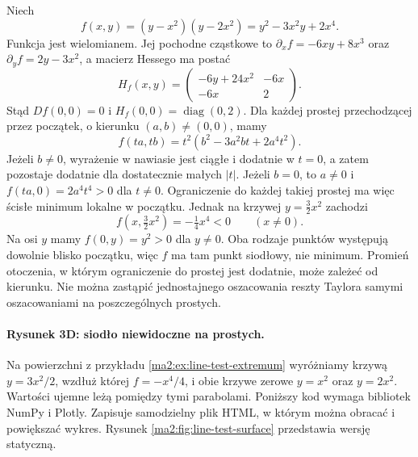 \begin{przyklad}
\label{ma2:ex:line-test-extremum}
Niech
\[
 f(x,y)=(y-x^2)(y-2x^2)=y^2-3x^2y+2x^4 .
\]
Funkcja jest wielomianem. Jej pochodne cząstkowe to
$\partial_x f=-6xy+8x^3$ oraz $\partial_y f=2y-3x^2$,
a macierz Hessego ma postać
\[
 H_f(x,y)=\begin{pmatrix}
 -6y+24x^2&-6x\\-6x&2
 \end{pmatrix}.
\]
Stąd $Df(0,0)=0$ i $H_f(0,0)=\operatorname{diag}(0,2)$.
Dla każdej prostej przechodzącej przez początek,
o kierunku $(a,b)\ne(0,0)$, mamy
\[
 f(ta,tb)=t^2(b^2-3a^2bt+2a^4t^2).
\]
Jeżeli $b\ne0$, wyrażenie w nawiasie jest ciągłe
i dodatnie w $t=0$, a zatem pozostaje dodatnie
dla dostatecznie małych $|t|$.
Jeżeli $b=0$, to $a\ne0$ i
$f(ta,0)=2a^4t^4>0$ dla $t\ne0$.
Ograniczenie do każdej takiej prostej ma więc ścisłe
minimum lokalne w początku.
Jednak na krzywej $y=\tfrac32x^2$ zachodzi
\[
 f(x,\tfrac32x^2)=-\tfrac14 x^4<0
 \qquad(x\ne0).
\]
Na osi $y$ mamy $f(0,y)=y^2>0$ dla $y\ne0$.
Oba rodzaje punktów występują dowolnie blisko początku,
więc $f$ ma tam punkt siodłowy, nie minimum.
Promień otoczenia, w którym ograniczenie do prostej
jest dodatnie, może zależeć od kierunku. Nie można
zastąpić jednostajnego oszacowania reszty Taylora
samymi oszacowaniami na poszczególnych prostych.
\end{przyklad}

\paragraph{Rysunek 3D: siodło niewidoczne na prostych.}
Na powierzchni z przykładu \ref{ma2:ex:line-test-extremum}
wyróżniamy krzywą $y=3x^2/2$, wzdłuż której
$f=-x^4/4$, i obie krzywe zerowe $y=x^2$ oraz $y=2x^2$.
Wartości ujemne leżą pomiędzy tymi parabolami.
Poniższy kod wymaga bibliotek NumPy i Plotly. Zapisuje samodzielny
plik HTML, w którym można obracać i powiększać wykres.
Rysunek \ref{ma2:fig:line-test-surface} przedstawia wersję statyczną.

